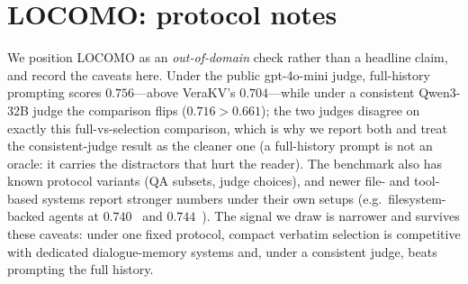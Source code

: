 \documentclass{article} %
\newcommand{\kvm}{VeraKV}
\begin{document}
\section{LOCOMO: protocol notes}
\label{app:benchcaveats}
We position LOCOMO as an \emph{out-of-domain} check rather than a headline claim, and
record the caveats here. Under the public gpt-4o-mini judge, full-history prompting
scores $0.756$---above \kvm{}'s $0.704$---while under a consistent Qwen3-32B judge the
comparison flips ($0.716 > 0.661$); the two judges disagree on exactly this
full-vs-selection comparison, which is why we report both and treat the
consistent-judge result as the cleaner one (a full-history prompt is not an oracle: it
carries the distractors that hurt the reader). The benchmark also has known protocol
variants (QA subsets, judge choices), and newer file- and tool-based systems report
stronger numbers under their own setups (e.g.\ filesystem-backed agents at
$0.740$~\citep{lettafiles} and $0.744$~\citep{pamlocomo}). The signal we draw is
narrower and survives these caveats: under one fixed protocol, compact verbatim
selection is competitive with dedicated dialogue-memory systems and, under a
consistent judge, beats prompting the full history.
\end{document}
